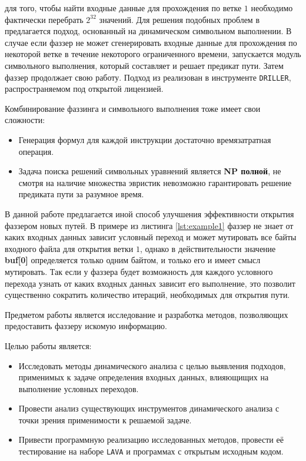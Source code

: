 для того, чтобы найти входные данные для прохождения по ветке $1$ необходимо фактически перебрать $2^{32}$ значений. Для решения подобных проблем в \cite{DRILLER} предлагается подход, основанный на динамическом символьном выполнении. В случае если фаззер не может сгенерировать входные данные для прохождения по некоторой ветке в течение некоторого ограниченного времени, запускается модуль символьного выполнения, который составляет и решает предикат пути. Затем фаззер продолжает свою работу.
Подход из \cite{DRILLER} реализован в инструменте \texttt{DRILLER}, распространяемом под открытой лицензией.

Комбинирование фаззинга и символьного выполнения тоже имеет свои сложности:
\begin{itemize}
    \item Генерация формул для каждой инструкции достаточно времязатратная операция.
    \item Задача поиска решений символьных уравнений является \textbf{NP полной}, не смотря на наличие множества эвристик невозможно гарантировать решение предиката пути за разумное время.
\end{itemize}

В данной работе предлагается иной способ улучшения эффективности открытия фаззером новых путей. В примере из листинга \ref{lst:example1} фаззер не знает от каких входных данных зависит условный переход и может мутировать все байты входного файла для открытия ветки $1$, однако в действительности значение \textbf{buf[0]} определяется только одним байтом, и только его и имеет смысл мутировать.
Так если у фаззера будет возможность для каждого условного перехода узнать от каких входных данных зависит его выполнение, это позволит существенно сократить количество итераций, необходимых для открытия пути.

Предметом работы является исследование и разработка методов, позволяющих предоставить фаззеру искомую информацию.

Целью работы является:
\begin{itemize}
    \item Исследовать методы динамического анализа с целью выявления подходов, применимых к задаче определения входных данных, влияющищих на выполнение условных переходов.
    \item Провести анализ существующих инструментов динамического анализа с точки зрения применимости к решаемой задаче.
    \item Привести программную реализацию исследованных методов, провести её тестирование на наборе \texttt{LAVA} и программах с открытым исходным кодом.
\end{itemize}


